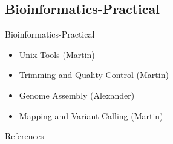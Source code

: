 \documentclass[presentation]{beamer}
\begin{document}
\subsection{Bioinformatics-Practical}
\label{sec-5-1}
\begin{frame}[label=sec-5-1-1]{Bioinformatics-Practical}
\begin{itemize}
\item Unix Tools (Martin)
\item Trimming and Quality Control (Martin)
\item Genome Assembly (Alexander)
\item Mapping and Variant Calling (Martin)
\end{itemize}
\end{frame}
\begin{frame}[allowframebreaks]{References}
\raggedright
\printbibliography[sorting=nty,heading=bibnumbered]
\end{frame}
\end{document}
